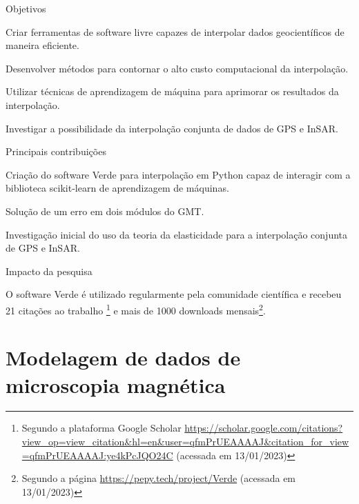 \documentclass[10pt,a4paper,oneside]{book}
\begin{document}
\begin{fancyenum}{\faBullseye}{Objetivos}
  \item Criar ferramentas de software livre capazes de interpolar dados
    geocientíficos de maneira eficiente.
  \item Desenvolver métodos para contornar o alto custo computacional da
    interpolação.
  \item Utilizar técnicas de aprendizagem de máquina para aprimorar os
    resultados da interpolação.
  \item Investigar a possibilidade da interpolação conjunta de dados de GPS e
    InSAR.
\end{fancyenum}
\begin{fancyenum}{\faLightbulb}{Principais contribuições}
  \item Criação do software Verde para interpolação em Python capaz de
    interagir com a biblioteca scikit-learn de aprendizagem de máquinas.
  \item Solução de um erro em dois módulos do GMT.
  \item Investigação inicial do uso da teoria da elasticidade para a
    interpolação conjunta de GPS e InSAR.
\end{fancyenum}
\begin{fancyenum}{\faRocket}{Impacto da pesquisa}
  \item O software Verde é utilizado regularmente pela comunidade científica
    e recebeu 21 citações ao trabalho \citet{Uieda2018}\footnote{Segundo a plataforma Google Scholar \url{https://scholar.google.com/citations?view_op=view_citation&hl=en&user=qfmPrUEAAAAJ&citation_for_view=qfmPrUEAAAAJ:ye4kPcJQO24C} (acessada em 13/01/2023)}
    e mais de 1000 downloads mensais\footnote{Segundo a página
    \url{https://pepy.tech/project/Verde} (acessada em 13/01/2023)}.
\end{fancyenum}


\section{Modelagem de dados de microscopia magnética}
\label{sec_micromag}
\end{document}
